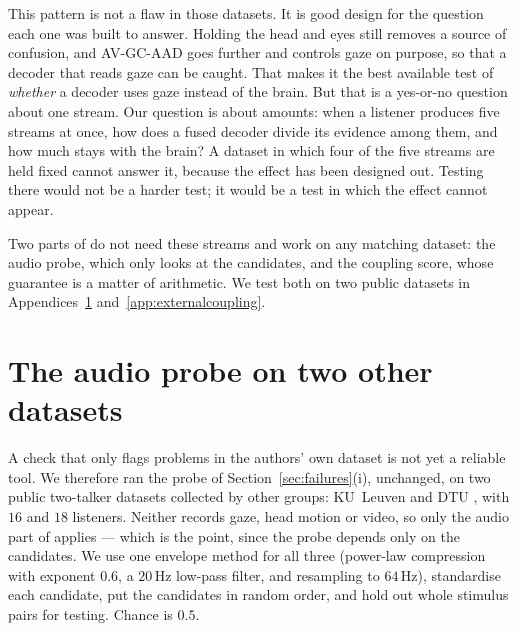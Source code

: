 This pattern is not a flaw in those datasets. It is good design for the question
each one was built to answer. Holding the head and eyes still removes a source of
confusion, and AV-GC-AAD goes further and controls gaze on purpose, so that a
decoder that reads gaze can be caught. That makes it the best available test of
\emph{whether} a decoder uses gaze instead of the brain. But that is a yes-or-no
question about one stream. Our question is about amounts: when a listener
produces five streams at once, how does a fused decoder divide its evidence among
them, and how much stays with the brain? A dataset in which four of the five
streams are held fixed cannot answer it, because the effect has been designed
out. Testing \merit{} there would not be a harder test; it would be a test in
which the effect cannot appear.

Two parts of \merit{} do not need these streams and work on any matching
dataset: the audio probe, which only looks at the candidates, and the coupling
score, whose guarantee is a matter of arithmetic. We test both on two public
datasets in Appendices~\ref{app:external} and~\ref{app:externalcoupling}.

\section{The audio probe on two other datasets}
\label{app:external}

A check that only flags problems in the authors' own dataset is not yet a
reliable tool. We therefore ran the probe of Section~\ref{sec:failures}(i),
unchanged, on two public two-talker datasets collected by other groups:
KU~Leuven \citep{biesmans2017kul,das2019kuldata} and DTU \citep{fuglsang2018dtu},
with $16$ and $18$ listeners. Neither
records gaze, head motion or video, so only the audio part of \merit{} applies ---
which is the point, since the probe depends only on the candidates. We use one
envelope method for all three (power-law compression with exponent $0.6$, a
$20$\,Hz low-pass filter, and resampling to $64$\,Hz), standardise each
candidate, put the candidates in random order, and hold out whole stimulus pairs
for testing. Chance is $0.5$.


